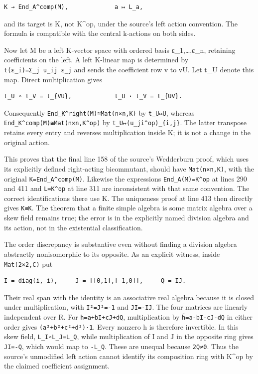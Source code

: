 \begin{verbatim}
K → End_A^comp(M),             a ↦ L_a,
\end{verbatim}

and its target is K, not K\^{}op, under the source's left action convention. The formula is compatible with the central k-actions on both sides.

Now let M be a left K-vector space with ordered basis ε\_1,\ldots,ε\_n, retaining coefficients on the left. A left K-linear map is determined by \texttt{t(ε\_i)=Σ\_j\ u\_ij\ ε\_j} and sends the coefficient row v to vU. Let t\_U denote this map. Direct multiplication gives

\begin{verbatim}
t_U ∘ t_V = t_{VU},            t_U ⋆ t_V = t_{UV}.
\end{verbatim}

Consequently \texttt{End\_K\^{}right(M)≅Mat(n×n,K)} by \texttt{t\_U↦U}, whereas \texttt{End\_K\^{}comp(M)≅Mat(n×n,K\^{}op)} by \texttt{t\_U↦(u\_ji\^{}op)\_\{i,j\}}. The latter transpose retains every entry and reverses multiplication inside K; it is not a change in the original action.

This proves that the final line 158 of the source's Wedderburn proof, which uses its explicitly defined right-acting bicommutant, should have \texttt{Mat(n×n,K)}, with the original \texttt{K=End\_A\^{}comp(M)}. Likewise the expressions \texttt{End\_A(M)=K\^{}op} at lines 290 and 411 and \texttt{L=K\^{}op} at line 311 are inconsistent with that same convention. The correct identifications there use K. The uniqueness proof at line 413 then directly gives \texttt{K≅K\textquotesingle{}}. The theorem that a finite simple algebra is some matrix algebra over a skew field remains true; the error is in the explicitly named division algebra and its action, not in the existential classification.

The order discrepancy is substantive even without finding a division algebra abstractly nonisomorphic to its opposite. As an explicit witness, inside \texttt{Mat(2×2,C)} put

\begin{verbatim}
I = diag(i,-i),     J = [[0,1],[-1,0]],     Q = IJ.
\end{verbatim}

Their real span with the identity is an associative real algebra because it is closed under multiplication, with \texttt{I²=J²=-1} and \texttt{JI=-IJ}. The four matrices are linearly independent over R. For \texttt{h=a+bI+cJ+dQ}, multiplication by \texttt{h̄=a-bI-cJ-dQ} in either order gives \texttt{(a²+b²+c²+d²)·1}. Every nonzero h is therefore invertible. In this skew field, \texttt{L\_I∘L\_J=L\_Q}, while multiplication of I and J in the opposite ring gives \texttt{JI=-Q}, which would map to \texttt{-L\_Q}. These are unequal because \texttt{2Q≠0}. Thus the source's unmodified left action cannot identify its composition ring with K\^{}op by the claimed coefficient assignment.


